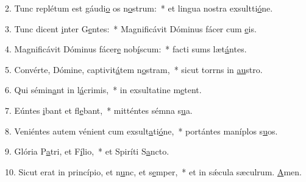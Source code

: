 2. Tunc replétum est gáudi\uline{o} os n\uline{o}strum:~* et lingua nostra exsultti\uline{ó}ne.\par 
3. Tunc dicent \uline{i}nter G\uline{e}ntes:~* Magnificávit Dóminus fácer cum \uline{e}is.\par 
4. Magnificávit Dóminus fácer\uline{e} nob\uline{í}scum:~* facti sums læt\uline{á}ntes.\par 
5. Convérte, Dómine, captivit\uline{á}tem n\uline{o}stram,~* sicut torrns in \uline{au}stro.\par 
6. Qui sémin\uline{a}nt in l\uline{á}crimis,~* in exsultatine m\uline{e}tent.\par 
7. Eúntes \uline{i}bant et fl\uline{e}bant,~* mitténtes sémna s\uline{u}a.\par 
8. Veniéntes autem vénient cum exsult\uline{a}ti\uline{ó}ne,~* portántes maníplos s\uline{u}os.\par 
9. Glória P\uline{a}tri, et F\uline{í}lio,~* et Spiríti S\uline{a}ncto.\par 
10. Sicut erat in princípio, et n\uline{u}nc, et s\uline{e}mper,~* et in sǽcula sæculrum. \uline{A}men.\par 
